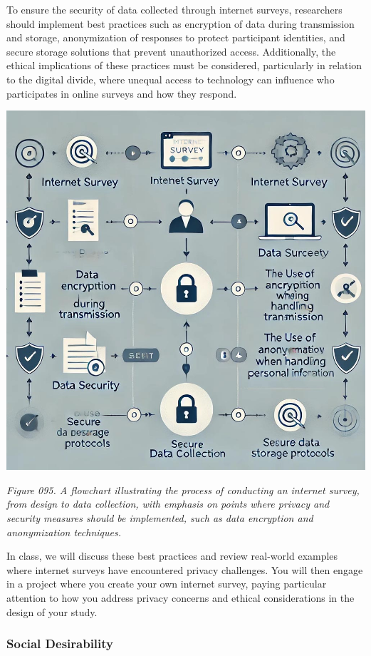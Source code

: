 \documentclass[
]{book}
\begin{document}
To ensure the security of data collected through internet surveys, researchers should implement best practices such as encryption of data during transmission and storage, anonymization of responses to protect participant identities, and secure storage solutions that prevent unauthorized access. Additionally, the ethical implications of these practices must be considered, particularly in relation to the digital divide, where unequal access to technology can influence who participates in online surveys and how they respond.

\includegraphics[width=1\textwidth,height=\textheight]{images/fig095.jpg}

\emph{Figure 095. A flowchart illustrating the process of conducting an internet survey, from design to data collection, with emphasis on points where privacy and security measures should be implemented, such as data encryption and anonymization techniques.}

In class, we will discuss these best practices and review real-world examples where internet surveys have encountered privacy challenges. You will then engage in a project where you create your own internet survey, paying particular attention to how you address privacy concerns and ethical considerations in the design of your study.

\subsubsection{Social Desirability}\label{social-desirability}
\end{document}
